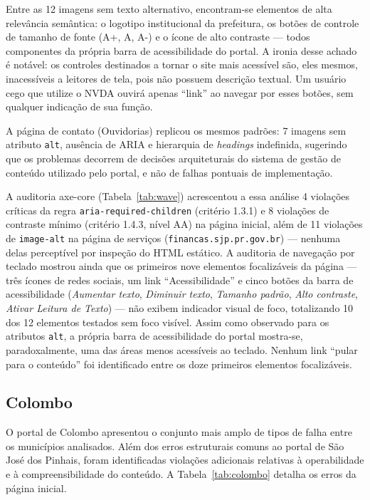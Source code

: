 \documentclass[brazil]{ifpr-pinhais}
\begin{document}
Entre as 12 imagens sem texto alternativo, encontram-se elementos de alta relevância semântica: o logotipo institucional da prefeitura, os botões de controle de tamanho de fonte (A+, A, A-) e o ícone de alto contraste --- todos componentes da própria barra de acessibilidade do portal. A ironia desse achado é notável: os controles destinados a tornar o site mais acessível são, eles mesmos, inacessíveis a leitores de tela, pois não possuem descrição textual. Um usuário cego que utilize o NVDA ouvirá apenas ``link'' ao navegar por esses botões, sem qualquer indicação de sua função.

A página de contato (Ouvidorias) replicou os mesmos padrões: 7 imagens sem atributo \texttt{alt}, ausência de ARIA e hierarquia de \textit{headings} indefinida, sugerindo que os problemas decorrem de decisões arquiteturais do sistema de gestão de conteúdo utilizado pelo portal, e não de falhas pontuais de implementação.

A auditoria axe-core (Tabela~\ref{tab:wave}) acrescentou a essa análise 4 violações críticas da regra \texttt{aria-required-children} (critério 1.3.1) e 8 violações de contraste mínimo (critério 1.4.3, nível AA) na página inicial, além de 11 violações de \texttt{image-alt} na página de serviços (\texttt{financas.sjp.pr.gov.br}) --- nenhuma delas perceptível por inspeção do HTML estático. A auditoria de navegação por teclado mostrou ainda que os primeiros nove elementos focalizáveis da página --- três ícones de redes sociais, um link ``Acessibilidade'' e cinco botões da barra de acessibilidade (\textit{Aumentar texto}, \textit{Diminuir texto}, \textit{Tamanho padrão}, \textit{Alto contraste}, \textit{Ativar Leitura de Texto}) --- não exibem indicador visual de foco, totalizando 10 dos 12 elementos testados sem foco visível. Assim como observado para os atributos \texttt{alt}, a própria barra de acessibilidade do portal mostra-se, paradoxalmente, uma das áreas menos acessíveis ao teclado. Nenhum link ``pular para o conteúdo'' foi identificado entre os doze primeiros elementos focalizáveis.

\subsection{Colombo}
\label{subsec:colombo}

O portal de Colombo apresentou o conjunto mais amplo de tipos de falha entre os municípios analisados. Além dos erros estruturais comuns ao portal de São José dos Pinhais, foram identificadas violações adicionais relativas à operabilidade e à compreensibilidade do conteúdo. A Tabela~\ref{tab:colombo} detalha os erros da página inicial.
\end{document}
